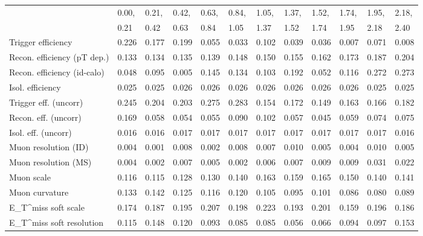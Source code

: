 \begin{tabular}{l|p{0.6cm}p{0.6cm}p{0.6cm}p{0.6cm}p{0.6cm}p{0.6cm}p{0.6cm}p{0.6cm}p{0.6cm}p{0.6cm}p{0.6cm}}
\hline
   & 0.00, & 0.21, & 0.42, & 0.63, & 0.84, & 1.05, & 1.37, & 1.52, & 1.74, & 1.95, & 2.18,  \\ 
   & 0.21 & 0.42 & 0.63 & 0.84 & 1.05 & 1.37 & 1.52 & 1.74 & 1.95 & 2.18 & 2.40  \\ 
\hline
Trigger efficiency                       & 0.226 & 0.177 & 0.199 & 0.055 & 0.033 & 0.102 & 0.039 & 0.036 & 0.007 & 0.071 & 0.008 \\
Recon. efficiency (pT dep.)              & 0.133 & 0.134 & 0.135 & 0.139 & 0.148 & 0.150 & 0.155 & 0.162 & 0.173 & 0.187 & 0.204 \\
Recon. efficiency (id-calo)              & 0.048 & 0.095 & 0.005 & 0.145 & 0.134 & 0.103 & 0.192 & 0.052 & 0.116 & 0.272 & 0.273 \\
Isol. efficiency                         & 0.025 & 0.025 & 0.026 & 0.026 & 0.026 & 0.026 & 0.026 & 0.026 & 0.026 & 0.025 & 0.025 \\
Trigger eff. (uncorr)                    & 0.245 & 0.204 & 0.203 & 0.275 & 0.283 & 0.154 & 0.172 & 0.149 & 0.163 & 0.166 & 0.182 \\
Recon. eff. (uncorr)                     & 0.169 & 0.058 & 0.054 & 0.055 & 0.090 & 0.102 & 0.057 & 0.045 & 0.059 & 0.074 & 0.075 \\
Isol. eff. (uncorr)                      & 0.016 & 0.016 & 0.017 & 0.017 & 0.017 & 0.017 & 0.017 & 0.017 & 0.017 & 0.017 & 0.016 \\
Muon resolution (ID)                     & 0.004 & 0.001 & 0.008 & 0.002 & 0.008 & 0.007 & 0.010 & 0.005 & 0.004 & 0.010 & 0.005 \\
Muon resolution (MS)                     & 0.004 & 0.002 & 0.007 & 0.005 & 0.002 & 0.006 & 0.007 & 0.009 & 0.009 & 0.031 & 0.022 \\
Muon scale                               & 0.116 & 0.115 & 0.128 & 0.130 & 0.140 & 0.163 & 0.159 & 0.165 & 0.150 & 0.140 & 0.141 \\
Muon curvature                           & 0.133 & 0.142 & 0.125 & 0.116 & 0.120 & 0.105 & 0.095 & 0.101 & 0.086 & 0.080 & 0.089 \\
E_{T}^{miss} soft scale                  & 0.174 & 0.187 & 0.195 & 0.207 & 0.198 & 0.223 & 0.193 & 0.201 & 0.159 & 0.196 & 0.186 \\
E_{T}^{miss} soft resolution             & 0.115 & 0.148 & 0.120 & 0.093 & 0.085 & 0.085 & 0.056 & 0.066 & 0.094 & 0.097 & 0.153 \\

\end{tabular}
